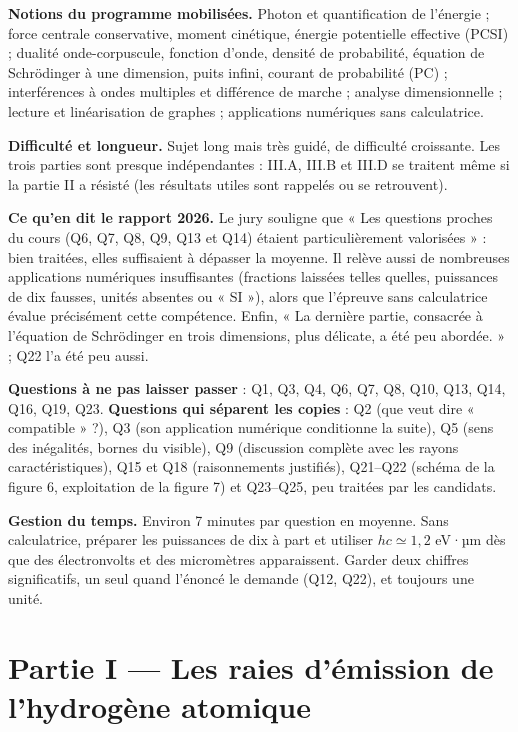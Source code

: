 \documentclass[11pt,a4paper]{article}
\begin{document}
\textbf{Notions du programme mobilisées.} Photon et quantification de l'énergie ; force centrale conservative, moment cinétique, énergie potentielle effective (PCSI) ; dualité onde-corpuscule, fonction d'onde, densité de probabilité, équation de Schrödinger à une dimension, puits infini, courant de probabilité (PC) ; interférences à ondes multiples et différence de marche ; analyse dimensionnelle ; lecture et linéarisation de graphes ; applications numériques sans calculatrice.

\textbf{Difficulté et longueur.} Sujet long mais très guidé, de difficulté croissante. Les trois parties sont presque indépendantes : III.A, III.B et III.D se traitent même si la partie II a résisté (les résultats utiles sont rappelés ou se retrouvent).

\textbf{Ce qu'en dit le rapport 2026.} Le jury souligne que « Les questions proches du cours (Q6, Q7, Q8, Q9, Q13 et Q14) étaient particulièrement valorisées » : bien traitées, elles suffisaient à dépasser la moyenne. Il relève aussi de nombreuses applications numériques insuffisantes (fractions laissées telles quelles, puissances de dix fausses, unités absentes ou « SI »), alors que l'épreuve sans calculatrice évalue précisément cette compétence. Enfin, « La dernière partie, consacrée à l'équation de Schrödinger en trois dimensions, plus délicate, a été peu abordée. » ; Q22 l'a été peu aussi.

\textbf{Questions à ne pas laisser passer} : Q1, Q3, Q4, Q6, Q7, Q8, Q10, Q13, Q14, Q16, Q19, Q23. \textbf{Questions qui séparent les copies} : Q2 (que veut dire « compatible » ?), Q3 (son application numérique conditionne la suite), Q5 (sens des inégalités, bornes du visible), Q9 (discussion complète avec les rayons caractéristiques), Q15 et Q18 (raisonnements justifiés), Q21--Q22 (schéma de la figure 6, exploitation de la figure 7) et Q23--Q25, peu traitées par les candidats.

\textbf{Gestion du temps.} Environ 7 minutes par question en moyenne. Sans calculatrice, préparer les puissances de dix à part et utiliser \(hc\simeq1{,}2\) eV·µm dès que des électronvolts et des micromètres apparaissent. Garder deux chiffres significatifs, un seul quand l'énoncé le demande (Q12, Q22), et toujours une unité.

\hypertarget{partie-i-les-raies-duxe9mission-de-lhydroguxe8ne-atomique}{%
\section{Partie I --- Les raies d'émission de l'hydrogène atomique}\label{partie-i-les-raies-duxe9mission-de-lhydroguxe8ne-atomique}}
\end{document}
